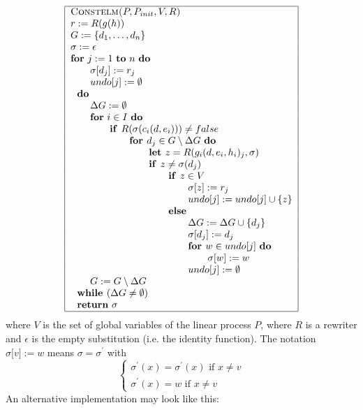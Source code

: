 \[
\begin{tabular}{|l|}
\hline
\textsc{Constelm(}$P,P_{init},V,R$\textsc{)} \\ 
$r:=R(g(h))$ \\ 
$G:=\{d_{1},\ldots ,d_{n}\}$ \\ 
$\sigma :=\epsilon $ \\ 
\textbf{for} $j:=1$ \textbf{to} $n$ \textbf{do} \\ 
$\qquad \sigma \lbrack d_{j}]:=r_{j}$ \\ 
$\qquad undo[j]:=\emptyset $ \\ 
$\text{\textbf{do}}$ \\ 
$\qquad \Delta G:=\emptyset $ \\ 
$\qquad $\textbf{for} $i\in I$ \textbf{do} \\ 
$\qquad \qquad $\textbf{if }$R(\sigma (c_{i}(d,e_{i})))\neq false$ \\ 
$\qquad \qquad \qquad $\textbf{for }$d_{j}\in G\setminus \Delta G$ \textbf{do%
} \\ 
$\qquad \qquad \qquad \qquad $\textbf{let }$z=R(g_{i}(d,e_{i},h_{i})_{j},%
\sigma )$ \\ 
$\qquad \qquad \qquad \qquad $\textbf{if }$z\neq \sigma (d_{j})$ \\ 
$\qquad \qquad \qquad \qquad \qquad $\textbf{if }$z\in V$ \\ 
$\qquad \qquad \qquad \qquad \qquad \qquad \sigma \lbrack z]:=r_{j}$ \\ 
$\qquad \qquad \qquad \qquad \qquad \qquad undo[j]:=undo[j]\cup \{z\}$ \\ 
$\qquad \qquad \qquad \qquad \qquad $\textbf{else} \\ 
$\qquad \qquad \qquad \qquad \qquad \qquad \Delta G:=\Delta G\cup \{d_{j}\}$
\\ 
$\qquad \qquad \qquad \qquad \qquad \qquad \sigma \lbrack d_{j}]:=d_{j}$ \\ 
$\qquad \qquad \qquad \qquad \qquad \qquad $\textbf{for }$w\in undo[j]$ 
\textbf{do} \\ 
$\qquad \qquad \qquad \qquad \qquad \qquad \qquad \sigma \lbrack w]:=w$ \\ 
$\qquad \qquad \qquad \qquad \qquad \qquad undo[j]:=\emptyset $ \\ 
$\qquad G:=G\setminus \Delta G$ \\ 
$\text{\textbf{while }}(\Delta G\neq \emptyset )$ \\ 
$\text{\textbf{return} }\sigma $ \\ \hline
\end{tabular}%
\]%
where $V$ is the set of global variables of the linear process $P$, where $R$
is a rewriter and $\epsilon $ is the empty substitution (i.e. the identity
function). The notation $\sigma \lbrack v]:=w$ means $\sigma =\sigma
^{\prime }$ with%
\[
\left\{ 
\begin{array}{l}
\sigma ^{\prime }(x)=\sigma ^{\prime }(x)\text{ if }x\neq v \\ 
\sigma ^{\prime }(x)=w\text{ if }x\neq v%
\end{array}%
\right. 
\]%
An alternative implementation may look like this:

